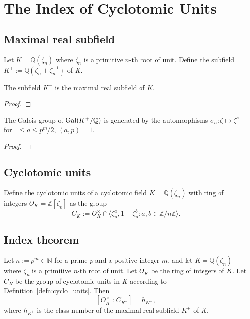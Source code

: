 \chapter{The Index of Cyclotomic Units}

\section{Maximal real subfield}
\begin{definition}\label{defn:K_plus}
    Let $K = \mathbb{Q}(\zeta_n)$ where $\zeta_n$ is a primitive $n$-th root of unit. 
    Define the subfield $K^+ := \mathbb{Q}(\zeta_n + \zeta_n^{-1})$ of $K$.
\end{definition}

\begin{lemma}\label{lem:K_plus_max_real_sub}
    The subfield $K^+$ is the maximal real subfield of $K$.
\end{lemma}

\begin{proof}
\end{proof}

\begin{lemma}\label{lem:gal_K_plus}
    The Galois group of $\operatorname{Gal}(K^+ / \mathbb{Q})$ is generated by the 
    automorphisms $\sigma_a \colon \zeta \mapsto \zeta^a$ for $1 \leq a \leq p^m / 2$, $(a, p) = 1$. 
\end{lemma}

\begin{proof}
\end{proof}

\section{Cyclotomic units}
\begin{definition}\label{defn:cyclo_units}
    Define the cyclotomic units of a cyclotomic field $K = \mathbb{Q}(\zeta_n)$ with ring of integers 
    $O_K = \mathbb{Z}[\zeta_n]$ as the group 
    $$
    C_K := O_K^\times \cap \langle \zeta_n^a, 1 - \zeta_n^b \colon a, b \in \mathbb{Z} / n \mathbb{Z}\rangle. 
    $$
\end{definition}

\section{Index theorem}
\begin{theorem}\label{thm:index_of_units}
    \notready
    Let $n := p^m \in \mathbb{N}$ for a prime $p$ and a positive integer $m$, and let $K = \mathbb{Q}(\zeta_n)$ where $\zeta_n$ is a primitive $n$-th root of unit. 
    Let $O_K$ be the ring of integers of $K$. 
    Let $C_K$ be the group of cyclotomic units in $K$ according to Definition~\ref{defn:cyclo_units}.
    Then
    \[
        [O_{K^+}^\times : C_{K^+}] = h_{K^+},
    \]
    where $h_{K^+}$ is the class number of the maximal real subfield $K^+$ of $K$.
\end{theorem}

